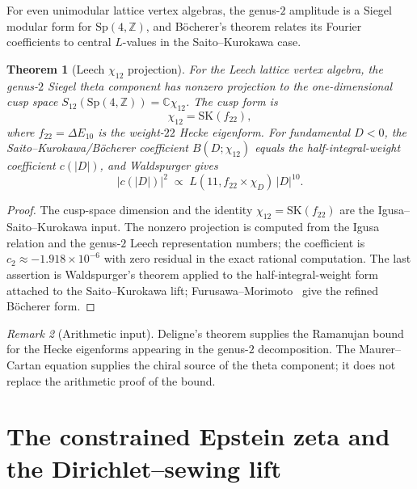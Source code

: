 \documentclass[11pt,reqno]{amsart}
\newtheorem{theorem}{Theorem}[section]
\theoremstyle{definition}
\theoremstyle{remark}
\newtheorem{remark}[theorem]{Remark}
\providecommand{\bC}{\mathbb{C}}
\providecommand{\bZ}{\mathbb{Z}}
\providecommand{\SK}{\mathrm{SK}}
\providecommand{\Sp}{\mathrm{Sp}}
\numberwithin{equation}{section}
\begin{document}
For even unimodular lattice vertex algebras, the genus-$2$ amplitude
is a Siegel modular form for $\Sp(4,\bZ)$, and B\"ocherer's theorem
relates its Fourier coefficients to central $L$-values in the
Saito--Kurokawa case.

\begin{theorem}[Leech $\chi_{12}$ projection]
  \label{thm:leech-chi12-projection-standalone}
  For the Leech lattice vertex algebra, the genus-$2$ Siegel theta
  component has nonzero projection to the one-dimensional cusp space
  $S_{12}(\Sp(4,\bZ))=\bC\chi_{12}$. The cusp form is
  \[
    \chi_{12}=\SK(f_{22}),
  \]
  where $f_{22}=\Delta E_{10}$ is the weight-$22$ Hecke eigenform.
  For fundamental $D<0$, the Saito--Kurokawa/B\"ocherer coefficient
  $B(D;\chi_{12})$ equals the half-integral-weight coefficient
  $c(|D|)$, and Waldspurger gives
  \begin{equation}\label{eq:waldspurger-leech-standalone}
  |c(|D|)|^2
  \;\propto\;
  L(11,f_{22}\times\chi_D)\,|D|^{10}.
  \end{equation}
\end{theorem}

\begin{proof}
The cusp-space dimension and the identity
$\chi_{12}=\SK(f_{22})$ are the Igusa--Saito--Kurokawa input. The
nonzero projection is computed from the Igusa relation and the
genus-$2$ Leech representation numbers; the coefficient is
$c_2\approx -1.918\times10^{-6}$ with zero residual in the exact
rational computation. The last assertion is Waldspurger's theorem
applied to the half-integral-weight form attached to the
Saito--Kurokawa lift; Furusawa--Morimoto~\cite{FurusawaMorimoto}
give the refined B\"ocherer form.
\end{proof}

\begin{remark}[Arithmetic input]\label{rem:weil-analogy}
Deligne's theorem supplies the Ramanujan bound for the Hecke
eigenforms appearing in the genus-$2$ decomposition. The
Maurer--Cartan equation supplies the chiral source of the theta
component; it does not replace the arithmetic proof of the bound.
\end{remark}


\section{The constrained Epstein zeta and the Dirichlet--sewing lift}
\label{sec:epstein}
\end{document}
